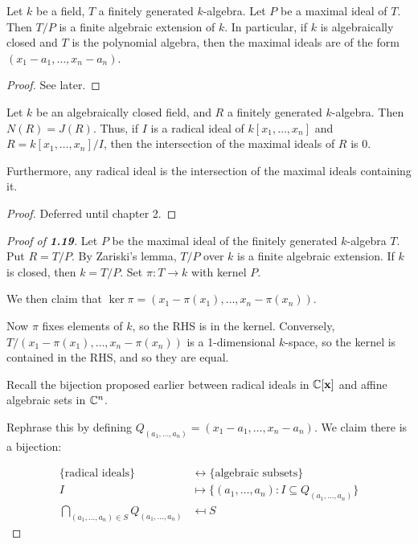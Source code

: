 \documentclass[10pt,a4paper]{article}
\begin{document}
\begin{theorem}
  Let $k$ be a field, $T$ a finitely generated $k$-algebra. Let $P$ be a maximal ideal of $T$. Then $T/P$ is a finite algebraic extension of $k$. In particular, if $k$ is algebraically closed and $T$ is the polynomial algebra, then the maximal ideals are of the form $(x_1-a_1, \ldots, x_n-a_n)$.
\end{theorem}
\begin{proof}
  See later.
\end{proof}
\begin{theorem}
  Let $k$ be an algebraically closed field, and $R$ a finitely generated $k$-algebra. Then $N(R) = J(R)$. Thus, if $I$ is a radical ideal of $k[x_1, \ldots, x_n]$ and $R = k[x_1, \ldots, x_n]/I$, then the intersection of the maximal ideals of $R$ is 0.

  Furthermore, any radical ideal is the intersection of the maximal ideals containing it.
\end{theorem}
\begin{proof}
  Deferred until chapter 2.
\end{proof}
\begin{proof}[Proof of \textbf{1.19}]
  Let $P$ be the maximal ideal of the finitely generated $k$-algebra $T$. Put $R = T/P$. By Zariski's lemma, $T/P$ over $k$  is a finite algebraic extension. If $k$ is closed, then $k = T/P$. Set $\pi:T \to k$ with kernel $P$.

  We then claim that $\ker \pi = (x_1 - \pi(x_1), \ldots, x_n - \pi(x_n))$.

  Now $\pi$ fixes elements of $k$, so the RHS is in the kernel. Conversely, $T/(x_1-\pi(x_1), \ldots, x_n-\pi(x_n))$ is a 1-dimensional $k$-space, so the kernel is contained in the RHS, and so they are equal.

  Recall the bijection proposed earlier between radical ideals in $\mathbb{C}[\mathbf{x}]$ and affine algebraic sets in $\mathbb{C}^n$.

  Rephrase this by defining $Q_{(a_1, \ldots, a_n)} = (x_1-a_1, \ldots, x_n-a_n)$. We claim there is a bijection:

  \begin{align*}
    \{\text{radical ideals}\} &\leftrightarrow \{\text{algebraic subsets}\}\\
    I &\mapsto \{(a_1, \ldots, a_n) : I \subseteq Q_{(a_1, \ldots, a_n)}\}\\
    \bigcap_{(a_1, \ldots, a_n) \in S}Q_{(a_1, \ldots, a_n)} &\mapsfrom S
  \end{align*}
\end{proof}
\end{document}
